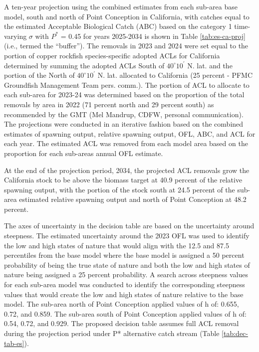 \documentclass[11pt,
  english,
  letterpaper,
]{article}
\begin{document}
A ten-year projection using the combined estimates from each sub-area base model, south and north of Point Conception in California, with catches equal to the estimated Acceptable Biological Catch (ABC) based on the category 1 time-varying \(\sigma\) with \(P^*\) = 0.45 for years 2025-2034 is shown in Table \ref{tab:es-ca-proj} (i.e., termed the ``buffer''). The removals in 2023 and 2024 were set equal to the portion of copper rockfish species-specific adopted ACLs for California determined by summing the adopted ACLs South of $40^\circ 10^\prime$ N. lat. and the portion of the North of $40^\circ 10^\prime$ N. lat. allocated to California (25 percent - PFMC Groundfish Management Team pers. comm.). The portion of ACL to allocate to each sub-area for 2023-24 was determined based on the proportion of the total removals by area in 2022 (71 percent north and 29 percent south) as recommended by the GMT (Mel Mandrup, CDFW, personal communication). The projections were conducted in an iterative fashion based on the combined estimates of spawning output, relative spawning output, OFL, ABC, and ACL for each year. The estimated ACL was removed from each model area based on the proportion for each sub-areas annual OFL estimate.

At the end of the projection period, 2034, the projected ACL removals grow the California stock to be above the biomass target at 40.9 percent of the relative spawning output, with the portion of the stock south at 24.5 percent of the sub-area estimated relative spawning output and north of Point Conception at 48.2 percent.

The axes of uncertainty in the decision table are based on the uncertainty around steepness. The estimated uncertainty around the 2023 OFL was used to identify the low and high states of nature that would align with the 12.5 and 87.5 percentiles from the base model where the base model is assigned a 50 percent probability of being the true state of nature and both the low and high states of nature being assigned a 25 percent probability. A search across steepness values for each sub-area model was conducted to identify the corresponding steepness values that would create the low and high states of nature relative to the base model. The sub-area north of Point Conception applied values of h of: 0.655, 0.72, and 0.859. The sub-area south of Point Conception applied values of h of: 0.54, 0.72, and 0.929. The proposed decision table assumes full ACL removal during the projection period under P* alternative catch stream (Table \ref{tab:dec-tab-es}).
\end{document}
